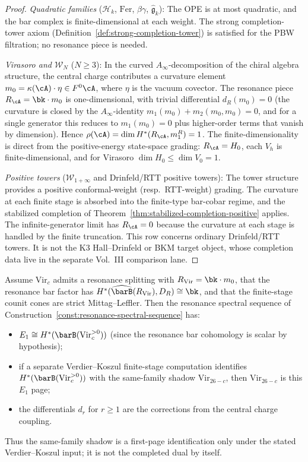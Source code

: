 \begin{proof}
\emph{Quadratic families} ($\mathcal{H}_k$, $\mathrm{Fer}$,
$\beta\gamma$, $\widehat{\mathfrak{g}}_k$):
The OPE is at most quadratic, and the bar complex is
finite-dimensional at each weight. The strong completion-tower
axiom (Definition~\ref{def:strong-completion-tower}) is
satisfied for the PBW filtration; no resonance piece is needed.

\emph{Virasoro and $\mathcal{W}_N$} ($N \ge 3$):
In the curved $A_\infty$-decomposition of the chiral algebra
structure, the central charge contributes a curvature element
$m_0 = \kappa(\cA) \cdot \eta \in F^0\cA$, where $\eta$ is
the vacuum covector.
The resonance piece $R_\cA = \bk \cdot m_0$ is
one-dimensional, with trivial differential $d_R(m_0) = 0$
(the curvature is closed by the $A_\infty$-identity
$m_1(m_0) + m_2(m_0, m_0) = 0$, and for a single generator
this reduces to $m_1(m_0) = 0$ plus higher-order terms that
vanish by dimension). Hence $\rho(\cA)
= \dim H^*(R_\cA, m_1^R) = 1$. The finite-dimensionality
is direct from the positive-energy state-space grading:
$R_\cA=H_0$, each $V_h$ is finite-dimensional, and for Virasoro
$\dim H_0 \leq \dim V_0 = 1$.

\emph{Positive towers}
($\mathcal{W}_{1+\infty}$ and Drinfeld/RTT positive towers):
The tower structure provides a positive conformal-weight (resp.\
RTT-weight) grading. The curvature at each finite stage is
absorbed into the finite-type bar-cobar regime, and the
stabilized completion of
Theorem~\ref{thm:stabilized-completion-positive} applies.
The infinite-generator limit has $R_\cA = 0$ because the
curvature at each stage is handled by the finite truncation.
This row concerns ordinary Drinfeld/RTT towers.  It is not the K3
Hall--Drinfeld or BKM target object, whose completion data live in the
separate Vol.~III comparison lane.
\end{proof}

\begin{corollary}
\label{cor:virasoro-resonance-ss}
Assume $\mathrm{Vir}_c$ admits a resonance splitting with
$R_{\mathrm{Vir}}=\bk\cdot m_0$, that the resonance bar factor has
$H^*(\widehat{\barB}(R_{\mathrm{Vir}}),D_R)\cong\bk$, and that the
finite-stage counit cones are strict Mittag--Leffler.  Then the
resonance spectral sequence of
Construction~\textup{\ref{const:resonance-spectral-sequence}}
has:
\begin{itemize}
\item $E_1 \cong H^*(\barB(\mathrm{Vir}_c^{>0}))$
 \textup{(}since the resonance bar cohomology is scalar by
 hypothesis\textup{)};
\item if a separate Verdier--Koszul finite-stage computation identifies
 $H^*(\barB(\mathrm{Vir}_c^{>0}))$ with the same-family shadow
 $\mathrm{Vir}_{26-c}$, then $\mathrm{Vir}_{26-c}$ is this
 $E_1$ page;
\item the differentials $d_r$ for $r \ge 1$ are the corrections
 from the central charge coupling.
\end{itemize}
Thus the same-family shadow is a first-page identification only under
the stated Verdier--Koszul input; it is not the completed dual by
itself.
\end{corollary}

